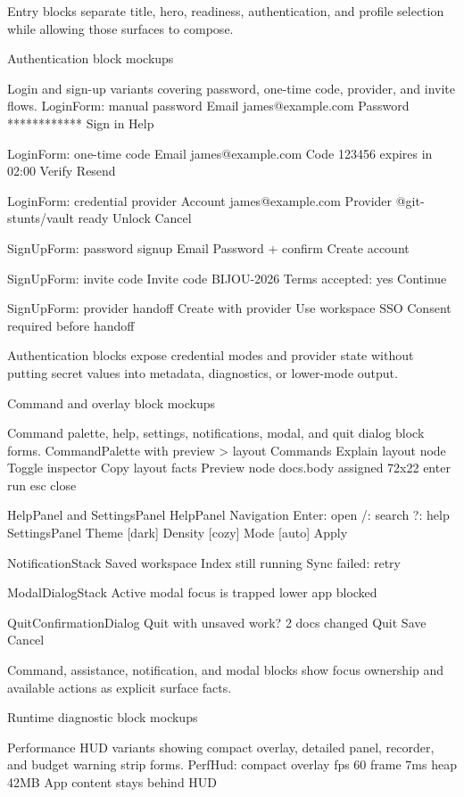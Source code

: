 Entry blocks separate title, hero, readiness, authentication, and profile selection while allowing those surfaces to compose.

Authentication block mockups

Login and sign-up variants covering password, one-time code, provider, and invite flows. LoginForm: manual password Email james@example.com Password ************ Sign in Help

LoginForm: one-time code Email james@example.com Code 123456 expires in 02:00 Verify Resend

LoginForm: credential provider Account james@example.com Provider @git-stunts/vault ready Unlock Cancel

SignUpForm: password signup Email Password + confirm Create account

SignUpForm: invite code Invite code BIJOU-2026 Terms accepted: yes Continue

SignUpForm: provider handoff Create with provider Use workspace SSO Consent required before handoff

Authentication blocks expose credential modes and provider state without putting secret values into metadata, diagnostics, or lower-mode output.

Command and overlay block mockups

Command palette, help, settings, notifications, modal, and quit dialog block forms. CommandPalette with preview \textgreater{} layout Commands Explain layout node Toggle inspector Copy layout facts Preview node docs.body assigned 72x22 enter run esc close

HelpPanel and SettingsPanel HelpPanel Navigation Enter: open /: search ?: help SettingsPanel Theme {[}dark{]} Density {[}cozy{]} Mode {[}auto{]} Apply

NotificationStack Saved workspace Index still running Sync failed: retry

ModalDialogStack Active modal focus is trapped lower app blocked

QuitConfirmationDialog Quit with unsaved work? 2 docs changed Quit Save Cancel

Command, assistance, notification, and modal blocks show focus ownership and available actions as explicit surface facts.

Runtime diagnostic block mockups

Performance HUD variants showing compact overlay, detailed panel, recorder, and budget warning strip forms. PerfHud: compact overlay fps 60 frame 7ms heap 42MB App content stays behind HUD

